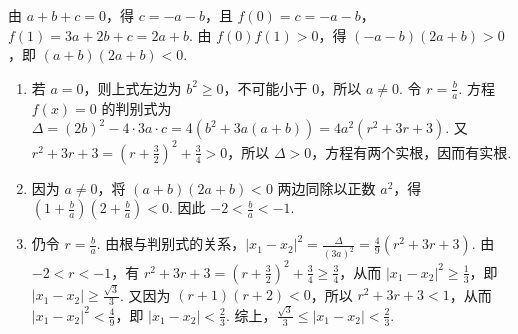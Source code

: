 \begin{solution}
由 \(a+b+c=0\)，得 \(c=-a-b\)，且 \(f(0)=c=-a-b\)，\(f(1)=3a+2b+c=2a+b\). 由 \(f(0)f(1)>0\)，得 \((-a-b)(2a+b)>0\)，即 \((a+b)(2a+b)<0\).

\begin{enumerate}
\item 若 \(a=0\)，则上式左边为 \(b^2\geqslant0\)，不可能小于 \(0\)，所以 \(a\neq0\). 令 \(r=\frac ba\). 方程 \(f(x)=0\) 的判别式为 \(\Delta=(2b)^2-4\cdot3a\cdot c=4\left(b^2+3a(a+b)\right)=4a^2(r^2+3r+3)\). 又 \(r^2+3r+3=\left(r+\frac32\right)^2+\frac34>0\)，所以 \(\Delta>0\)，方程有两个实根，因而有实根.

\item 因为 \(a\neq0\)，将 \((a+b)(2a+b)<0\) 两边同除以正数 \(a^2\)，得 \(\left(1+\frac ba\right)\left(2+\frac ba\right)<0\). 因此 \(-2<\frac ba<-1\).

\item 仍令 \(r=\frac ba\). 由根与判别式的关系，\(\lvert x_1-x_2\rvert^2=\frac{\Delta}{(3a)^2}=\frac49(r^2+3r+3)\). 由 \(-2<r<-1\)，有 \(r^2+3r+3=\left(r+\frac32\right)^2+\frac34\geqslant\frac34\)，从而 \(\lvert x_1-x_2\rvert^2\geqslant\frac13\)，即 \(\lvert x_1-x_2\rvert\geqslant\frac{\sqrt3}{3}\). 又因为 \((r+1)(r+2)<0\)，所以 \(r^2+3r+3<1\)，从而 \(\lvert x_1-x_2\rvert^2<\frac49\)，即 \(\lvert x_1-x_2\rvert<\frac23\). 综上，\(\frac{\sqrt3}{3}\leqslant\lvert x_1-x_2\rvert<\frac23\).
\end{enumerate}
\end{solution}
